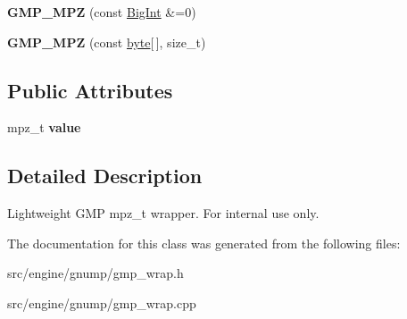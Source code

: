 \begin{DoxyCompactItemize}
\item 
\hypertarget{classBotan_1_1GMP__MPZ_afcbd2877d43012dd53c979facb1d604c}{{\bfseries G\-M\-P\-\_\-\-M\-P\-Z} (const \hyperlink{classBotan_1_1BigInt}{Big\-Int} \&=0)}\label{classBotan_1_1GMP__MPZ_afcbd2877d43012dd53c979facb1d604c}

\item 
\hypertarget{classBotan_1_1GMP__MPZ_a243bbb493b7b1f74158b0ff0aa0a2886}{{\bfseries G\-M\-P\-\_\-\-M\-P\-Z} (const \hyperlink{namespaceBotan_a7d793989d801281df48c6b19616b8b84}{byte}\mbox{[}$\,$\mbox{]}, size\-\_\-t)}\label{classBotan_1_1GMP__MPZ_a243bbb493b7b1f74158b0ff0aa0a2886}

\end{DoxyCompactItemize}
\subsection*{Public Attributes}
\begin{DoxyCompactItemize}
\item 
\hypertarget{classBotan_1_1GMP__MPZ_a08f0d9fdc1fa05e54456d3461292d806}{mpz\-\_\-t {\bfseries value}}\label{classBotan_1_1GMP__MPZ_a08f0d9fdc1fa05e54456d3461292d806}

\end{DoxyCompactItemize}


\subsection{Detailed Description}
Lightweight G\-M\-P mpz\-\_\-t wrapper. For internal use only. 

The documentation for this class was generated from the following files\-:\begin{DoxyCompactItemize}
\item 
src/engine/gnump/gmp\-\_\-wrap.\-h\item 
src/engine/gnump/gmp\-\_\-wrap.\-cpp\end{DoxyCompactItemize}
